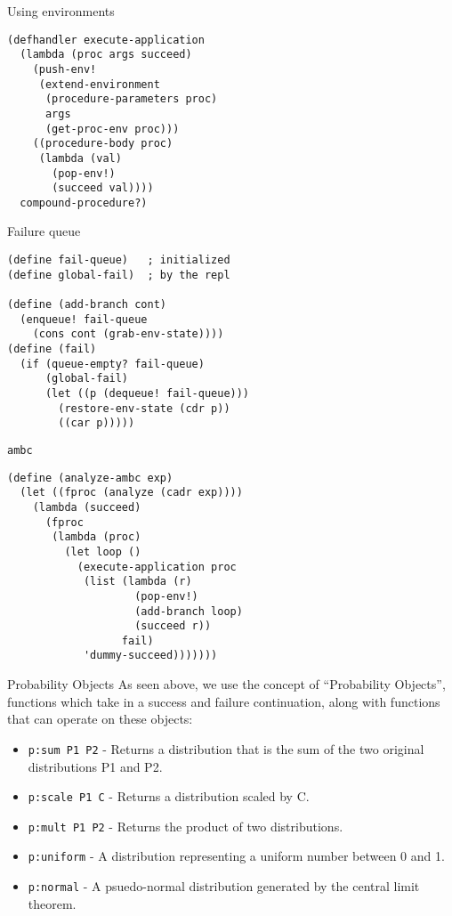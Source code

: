 \documentclass[14pt]{beamer}
\begin{document}
\begin{frame}[fragile]{Using environments}
  \begin{lstlisting}
(defhandler execute-application
  (lambda (proc args succeed)
    (push-env! 
     (extend-environment
      (procedure-parameters proc)
      args
      (get-proc-env proc)))
    ((procedure-body proc)
     (lambda (val)
       (pop-env!)
       (succeed val))))
  compound-procedure?)
  \end{lstlisting}
\end{frame}

\begin{frame}[fragile]{Failure queue}
  \begin{lstlisting}
(define fail-queue)   ; initialized
(define global-fail)  ; by the repl

(define (add-branch cont)
  (enqueue! fail-queue
    (cons cont (grab-env-state))))
(define (fail)
  (if (queue-empty? fail-queue)
      (global-fail)
      (let ((p (dequeue! fail-queue)))
        (restore-env-state (cdr p))
        ((car p)))))
  \end{lstlisting}
\end{frame}

\begin{frame}[fragile]{\texttt{ambc}}
  \begin{lstlisting}
(define (analyze-ambc exp)
  (let ((fproc (analyze (cadr exp))))
    (lambda (succeed)
      (fproc
       (lambda (proc)
         (let loop ()     
           (execute-application proc
            (list (lambda (r)
                    (pop-env!)
                    (add-branch loop)
                    (succeed r))
                  fail)
            'dummy-succeed)))))))
  \end{lstlisting}
\end{frame}

\begin{frame}{Probability Objects}
  As seen above, we use the concept of ``Probability Objects'', functions which
  take in a success and failure continuation, along with functions that can
  operate on these objects:\\
  \begin{itemize}
    \item \texttt{p:sum P1 P2} - Returns a distribution that is the sum of the
        two original distributions P1 and P2.
    \item \texttt{p:scale P1 C} - Returns a distribution scaled by C.
    \item \texttt{p:mult P1 P2} - Returns the product of two distributions.
    \item \texttt{p:uniform} - A distribution representing a uniform number
      between 0 and 1.
    \item \texttt{p:normal} - A psuedo-normal distribution generated by the
      central limit theorem.
  \end{itemize}
\end{frame}
\end{document}
